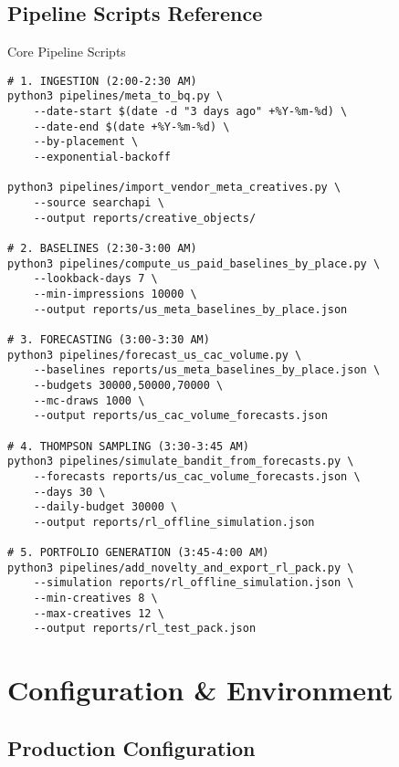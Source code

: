 \documentclass[11pt,a4paper]{report}
\begin{document}
\subsection{Pipeline Scripts Reference}

\begin{techbox}{Core Pipeline Scripts}
\begin{verbatim}
# 1. INGESTION (2:00-2:30 AM)
python3 pipelines/meta_to_bq.py \
    --date-start $(date -d "3 days ago" +%Y-%m-%d) \
    --date-end $(date +%Y-%m-%d) \
    --by-placement \
    --exponential-backoff

python3 pipelines/import_vendor_meta_creatives.py \
    --source searchapi \
    --output reports/creative_objects/

# 2. BASELINES (2:30-3:00 AM)
python3 pipelines/compute_us_paid_baselines_by_place.py \
    --lookback-days 7 \
    --min-impressions 10000 \
    --output reports/us_meta_baselines_by_place.json

# 3. FORECASTING (3:00-3:30 AM)
python3 pipelines/forecast_us_cac_volume.py \
    --baselines reports/us_meta_baselines_by_place.json \
    --budgets 30000,50000,70000 \
    --mc-draws 1000 \
    --output reports/us_cac_volume_forecasts.json

# 4. THOMPSON SAMPLING (3:30-3:45 AM)
python3 pipelines/simulate_bandit_from_forecasts.py \
    --forecasts reports/us_cac_volume_forecasts.json \
    --days 30 \
    --daily-budget 30000 \
    --output reports/rl_offline_simulation.json

# 5. PORTFOLIO GENERATION (3:45-4:00 AM)
python3 pipelines/add_novelty_and_export_rl_pack.py \
    --simulation reports/rl_offline_simulation.json \
    --min-creatives 8 \
    --max-creatives 12 \
    --output reports/rl_test_pack.json
\end{verbatim}
\end{techbox}

\section{Configuration \& Environment}

\subsection{Production Configuration}
\end{document}
